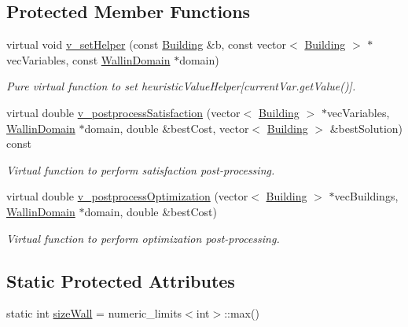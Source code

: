\subsection*{Protected Member Functions}
\begin{DoxyCompactItemize}
\item 
virtual void \hyperlink{classghost_1_1WallinObjective_abc0f66adeebca9f9787a4ae348219fb8}{v\-\_\-set\-Helper} (const \hyperlink{classghost_1_1Building}{Building} \&b, const vector$<$ \hyperlink{classghost_1_1Building}{Building} $>$ $\ast$vec\-Variables, const \hyperlink{classghost_1_1WallinDomain}{Wallin\-Domain} $\ast$domain)
\begin{DoxyCompactList}\small\item\em Pure virtual function to set heuristic\-Value\-Helper\mbox{[}current\-Var.\-get\-Value()\mbox{]}. \end{DoxyCompactList}\item 
virtual double \hyperlink{classghost_1_1WallinObjective_a84bf06db1526faf60d5b1354230f5d4f}{v\-\_\-postprocess\-Satisfaction} (vector$<$ \hyperlink{classghost_1_1Building}{Building} $>$ $\ast$vec\-Variables, \hyperlink{classghost_1_1WallinDomain}{Wallin\-Domain} $\ast$domain, double \&best\-Cost, vector$<$ \hyperlink{classghost_1_1Building}{Building} $>$ \&best\-Solution) const 
\begin{DoxyCompactList}\small\item\em Virtual function to perform satisfaction post-\/processing. \end{DoxyCompactList}\item 
virtual double \hyperlink{classghost_1_1WallinObjective_aa30f157bc7a09fdfe2a671960e4e60df}{v\-\_\-postprocess\-Optimization} (vector$<$ \hyperlink{classghost_1_1Building}{Building} $>$ $\ast$vec\-Buildings, \hyperlink{classghost_1_1WallinDomain}{Wallin\-Domain} $\ast$domain, double \&best\-Cost)
\begin{DoxyCompactList}\small\item\em Virtual function to perform optimization post-\/processing. \end{DoxyCompactList}\end{DoxyCompactItemize}
\subsection*{Static Protected Attributes}
\begin{DoxyCompactItemize}
\item 
static int \hyperlink{classghost_1_1WallinObjective_aef1d7697ca6b29eccb4f3c62f42316ed}{size\-Wall} = numeric\-\_\-limits$<$int$>$\-::max()
\end{DoxyCompactItemize}
